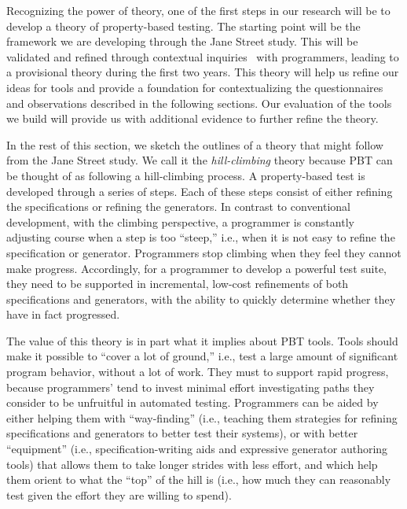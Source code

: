 Recognizing the power of theory, one of the first steps in our
research will be to develop a theory of property-based
testing. The starting point
will be the framework we are developing through the Jane Street study. This
will be validated and refined through contextual inquiries~\cite[Ch.
3]{ref:holtzblatt1997contextual} with programmers, leading to a provisional
theory during the first two years.  This theory will help us
refine our ideas for 
tools and provide a foundation for contextualizing the questionnaires and
observations described in the following sections. Our evaluation of
the tools we build will provide us with additional evidence to further
refine the theory.

In the rest of this section, we sketch the outlines of a theory that might
follow from the Jane 
Street study.
We call it the \emph{hill-climbing} theory because
PBT can be thought of as following a hill-climbing process. A
property-based test 
is developed through a series of steps. Each of these steps consist of either
refining the specifications or refining the generators. In contrast to
conventional development, with the climbing perspective, a programmer is
constantly adjusting course when a step is too ``steep,'' i.e., when it is not
easy to refine the specification or generator. Programmers stop climbing when
they feel they cannot make progress. Accordingly, for a programmer to develop a
powerful test suite, they need to be supported in incremental, low-cost
refinements of both specifications and generators, with the ability to quickly
determine whether they have in fact progressed.

The value of this theory is in part what it implies about PBT tools.
Tools should make it possible to ``cover a lot of ground,'' i.e., test a
large amount of significant program behavior, without a lot of work. They must
to support rapid progress, because programmers' tend to invest minimal effort
investigating paths they consider to be unfruitful in automated testing.
Programmers can be aided by either helping them with ``way-finding'' (i.e.,
teaching them strategies for refining specifications and generators to better
test their systems), or with better ``equipment'' (i.e., specification-writing
aids and expressive generator authoring tools) that allows them to take longer
strides with less effort, and which help them orient to what the ``top'' of the
hill is (i.e., how much they can reasonably test given the effort they are
willing to spend).   

